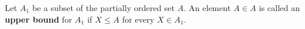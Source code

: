 Let $A_1$ be a subset of the partially ordered set $A$. An element $A \in A$ is called an \textbf{upper bound} for $A_1$ if $X \leq A$ for every $X \in A_1$.

